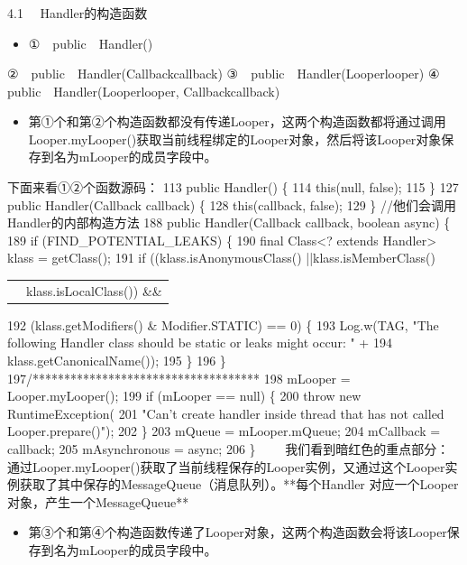 \documentclass[9pt, b5paper]{article}
\begin{document}
\subsubsection{}
\label{sec-6-0-4}
4.1 　Handler的构造函数
\begin{itemize}
\item ①　public　Handler()
\end{itemize}
②　public　Handler(Callbackcallback)
③　public　Handler(Looperlooper)
④　public　Handler(Looperlooper, Callbackcallback) 　
\begin{itemize}
\item 第①个和第②个构造函数都没有传递Looper，这两个构造函数都将通过调用Looper.myLooper()获取当前线程绑定的Looper对象，然后将该Looper对象保存到名为mLooper的成员字段中。 　
\end{itemize}
下面来看①②个函数源码：
113    public Handler() \{
114        this(null, false);
115    \}
127    public Handler(Callback callback) \{
128        this(callback, false);
129    \}
//他们会调用Handler的内部构造方法
188    public Handler(Callback callback, boolean async) \{
189        if (FIND\_POTENTIAL\_LEAKS) \{
190      final Class<? extends Handler> klass = getClass();
191      if ((klass.isAnonymousClass() ||klass.isMemberClass()
\begin{center}
\begin{tabular}{ll}
 & klass.isLocalClass()) \&\&\\
\end{tabular}
\end{center}
192                    (klass.getModifiers() \& Modifier.STATIC) == 0) \{
193                Log.w(TAG, "The following Handler class should be static or leaks might occur: " +
194                    klass.getCanonicalName());
195            \}
196        \}
197/************************************
198        mLooper = Looper.myLooper();
199        if (mLooper == null) \{
200            throw new RuntimeException(
201                "Can't create handler inside thread that has not called Looper.prepare()");
202        \}
203        mQueue = mLooper.mQueue;
204        mCallback = callback;
205        mAsynchronous = async;
206    \}
  　　我们看到暗红色的重点部分：
通过Looper.myLooper()获取了当前线程保存的Looper实例，又通过这个Looper实例获取了其中保存的MessageQueue（消息队列）。**每个Handler 对应一个Looper对象，产生一个MessageQueue**
\begin{itemize}
\item 第③个和第④个构造函数传递了Looper对象，这两个构造函数会将该Looper保存到名为mLooper的成员字段中。
\end{itemize}
\end{document}
